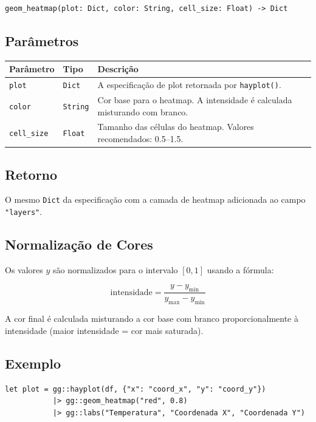 \documentclass[12pt, a4paper, oneside]{book}
\newcommand{\code}[1]{\texttt{#1}}
\begin{document}
\begin{lstlisting}[style=inline]
geom_heatmap(plot: Dict, color: String, cell_size: Float) -> Dict
\end{lstlisting}

\subsection*{Parâmetros}

\begin{tabularx}{\textwidth}{@{}lL{2.5cm}X@{}}
  \toprule
  \textbf{Parâmetro} & \textbf{Tipo} & \textbf{Descrição} \\
  \midrule
  \code{plot}      & \code{Dict}   & A especificação de plot retornada por \code{hayplot()}. \\[4pt]
  \code{color}     & \code{String} & Cor base para o heatmap. A intensidade é calculada misturando com branco. \\[4pt]
  \code{cell\_size} & \code{Float}  & Tamanho das células do heatmap. Valores recomendados: 0.5--1.5. \\
  \bottomrule
\end{tabularx}

\subsection*{Retorno}

O mesmo \code{Dict} da especificação com a camada de heatmap adicionada ao
campo \code{"layers"}.

\subsection*{Normalização de Cores}

Os valores $y$ são normalizados para o intervalo $[0, 1]$ usando a fórmula:

\[
\text{intensidade} = \frac{y - y_{\min}}{y_{\max} - y_{\min}}
\]

A cor final é calculada misturando a cor base com branco proporcionalmente à
intensidade (maior intensidade = cor mais saturada).

\subsection*{Exemplo}

\begin{lstlisting}[caption={Heatmap de temperatura em grade}]
let plot = gg::hayplot(df, {"x": "coord_x", "y": "coord_y"})
           |> gg::geom_heatmap("red", 0.8)
           |> gg::labs("Temperatura", "Coordenada X", "Coordenada Y")
\end{lstlisting}
\end{document}
